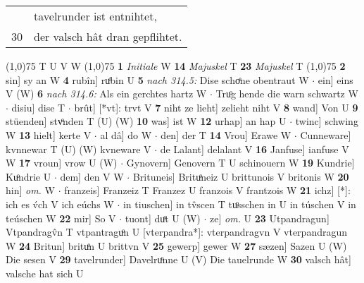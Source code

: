 \documentclass[8pt,a4paper,notitlepage]{article}
\begin{document}
\begin{table}[ht]
\begin{minipage}[t]{0.5\linewidth}
\begin{tabular}{rl}
 & tavelrunder ist entnihtet,\\ 
30 & der valsch hât dran gepflihtet.\\ 
\end{tabular}
\scriptsize
\line(1,0){75} \newline
T U V W \newline
\line(1,0){75} \newline
\textbf{1} \textit{Initiale} W  \textbf{14} \textit{Majuskel} T  \textbf{23} \textit{Majuskel} T  \newline
\line(1,0){75} \newline
\textbf{2} sin] sy an W \textbf{4} rubîn] ruͦbin U \textbf{5} \textit{nach 314.5:} Dise schoͤne obentraut W   $\cdot$ ein] eins V (W) \textbf{6} \textit{nach 314.6:} Als ein gerchtes hartz W   $\cdot$ Truͦg hende die warn schwartz W  $\cdot$ disiu] dise T  $\cdot$ brût] [*vt]: trvt V \textbf{7} niht ze lieht] zelieht niht V \textbf{8} wand] Von U \textbf{9} stüenden] stvͦnden T (U) (W) \textbf{10} was] ist W \textbf{12} urhap] an hap U  $\cdot$ twinc] schwing W \textbf{13} hielt] kerte V  $\cdot$ al dâ] do W  $\cdot$ den] der T \textbf{14} Vrou] Erawe W  $\cdot$ Cunneware] kvnnewar T (U) (W) kvneware V  $\cdot$ de Lalant] delalant V \textbf{16} Janfuse] ianfuse V W \textbf{17} vroun] vrow U (W)  $\cdot$ Gynovern] Genovern T U schinouern W \textbf{19} Kundrie] Kuͦndrie U  $\cdot$ dem] den V W  $\cdot$ Brituneis] Brituͦneiz U brittunois V britonis W \textbf{20} hin] \textit{om.} W  $\cdot$ franzeis] Franzeiz T Franzez U franzois V frantzois W \textbf{21} ichz] [*]: ich es v́ch V ich eúchs W  $\cdot$ in tiuschen] in tv̂scen T tuͦsschen in U in túschen V in teúschen W \textbf{22} mir] So V  $\cdot$ tuont] duͦt U (W)  $\cdot$ ze] \textit{om.} U \textbf{23} Utpandragun] Vtpandragv̂n T vtpantraguͦn U [vterpandra*]: vterpandragvn V vterpandragun W \textbf{24} Britun] brituͦn U brittvn V \textbf{25} gewerp] gewer W \textbf{27} sæzen] Sazen U (W) Die sesen V \textbf{29} tavelrunder] Davelruͦnne U (V) Die tauelrunde W \textbf{30} valsch hât] valsche hat sich U \newline
\end{minipage}
\end{table}
\end{document}
